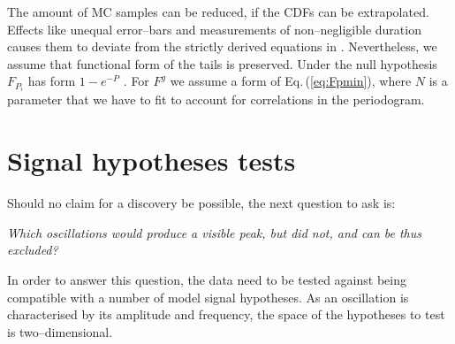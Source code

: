 The amount of MC samples can be reduced, if the CDFs can be extrapolated. Effects like unequal error--bars and measurements of non--negligible duration causes them to deviate from the strictly derived equations in \cite{Scargle1982}. Nevertheless, we assume that functional form of the tails is preserved. Under the null hypothesis $F_{P_i}$ has form $1 - e^{-P}$ \cite{Scargle1982}. For $F^g$ we assume a form of Eq.\,(\ref{eq:Fpmin}), where $N$ is a parameter that we have to fit to account for correlations in the periodogram.

%





\section{Signal hypotheses tests}
Should no claim for a discovery be possible, the next question to ask is:
\begin{center}
  \emph{Which oscillations would produce a visible peak, but did not, and can be thus excluded?}
\end{center}
In order to answer this question, the data need to be tested against being compatible with a number of model signal hypotheses. As an oscillation is characterised by its amplitude and frequency, the space of the hypotheses to test is two--dimensional.

